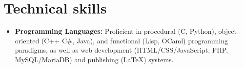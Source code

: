 \documentclass[11pt,a4paper,sans]{moderncv}
\begin{document}
{\begin{comment}
        \vspace{3pt}

        \small{This challenging project took place over the entirety of my third year. It required excellent planning and organisational skills, and the ability to teach myself an entirely new and complex subject. The project was a success, with the system being able to localise a radioactive source down to $ 3 cm$ within a $ 600 m^3$ sensor array. This project has been suggested for publication by my supervisor.}}

      \vspace{6pt}

    \item{\textbf{Industrial Project with Leyland Motors Ltd:}\textit{'Development of a Facility to Ensure the Achievement of Torque Parameters for a Specific Axle Configuration'}

        \vspace{3pt}

        \small{In the 3rd year of my course I spent a week completing an industrial project for Leyland Motors. I worked with a team operating as consultants for a particular problem the company was having. During this project I was working in a professional environment, and co-operating with various managers and engineers to create a design that met the requirements of the problem.}}


    \end{itemize}
  \end{comment}
  \section{Technical skills}

  \vspace{6pt}

  \begin{itemize}

  \item \textbf{Programming Languages:} Proficient in procedural (C, Python), object--oriented (C++ C\#, Java), and functional (Lisp, OCaml) programming paradigms, as well as web development (HTML/CSS/JavaScript, PHP, MySQL/MariaDB) and publishing (LaTeX) systems.

    \vspace{6pt}
    \begin{comment}
    \item \textbf{Industry Software Skills:} Most MS Office products, 


\end{comment}
\end{itemize}}
\end{document}
